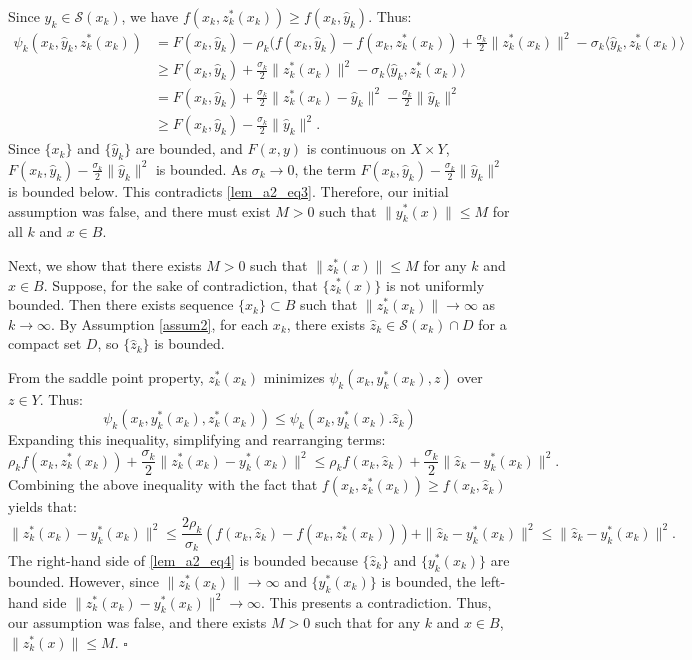 \documentclass{article}
\newenvironment{proof}[1][Proof]{\par
	\normalfont\topsep6pt\relax
	\trivlist\item[\hskip\labelsep\itshape #1.]\ignorespaces
}{%
	\hfill\ensuremath{\square}\endtrivlist
}
\begin{document}
\begin{proof}
\begin{equation}
\end{equation}
Since $\hat{y}_k \in \mathcal{S}(x_k)$, we have $f(x_k,  z_{k}^*(x_{k})) \ge f(x_k, \hat{y}_k)$. Thus:
\[
\begin{aligned}
    \psi_k(x_k, \hat{y}_k, z_{k}^*(x_k)) &= F(x_k, \hat{y}_k) - \rho_k( f(x_k, \hat{y}_k) - f(x_k, z_{k}^*(x_k)) + \frac{\sigma_k}{2}\|z_{k}^*(x_k)\|^2 - \sigma_k \langle \hat{y}_k, z_{k}^*(x_k) \rangle \\
    & \ge F(x_k, \hat{y}_k) + \frac{\sigma_k}{2}\|z_{k}^*(x_k)\|^2 - \sigma_k \langle \hat{y}_k, z_{k}^*(x_k) \rangle \\
    & = F(x_k, \hat{y}_k) + \frac{\sigma_k}{2}\|z_{k}^*(x_k) - \hat{y}_k\|^2 -  \frac{\sigma_k}{2}\|\hat{y}_k\|^2 \\
    & \ge F(x_k, \hat{y}_k) -  \frac{\sigma_k}{2}\|\hat{y}_k\|^2.
\end{aligned}
\]
Since $\{x_k\}$ and $\{\hat{y}_k\}$ are bounded, and $F(x,y)$ is continuous on $X \times Y$, $F(x_k, \hat{y}_k) -  \frac{\sigma_k}{2}\|\hat{y}_k\|^2$ is bounded. As $\sigma_k \rightarrow 0$, the term $ F(x_k, \hat{y}_k) -  \frac{\sigma_k}{2}\|\hat{y}_k\|^2$ is bounded below. This contradicts \eqref{lem_a2_eq3}. Therefore, our initial assumption was false, and there must exist $M > 0$ such that $\|y^*_{k}(x)\| \le M$ for all $k$ and $x \in B$.

Next, we show that there exists $M > 0$ such that $\|z^*_{k}(x)\| \le M$ for any $k$ and $x \in B$. Suppose, for the sake of contradiction, that $\{z^*_{k}(x)\}$ is not uniformly bounded. Then there exists sequence $\{x_k\} \subset B$ such that $\|z^*_{k}(x_k)\| \rightarrow \infty$ as $k \rightarrow \infty$. By Assumption \ref{assum2}, for each $x_k$, there exists $\hat{z}_k \in \mathcal{S}(x_k) \cap D$ for a compact set $D$, so  $\{\hat{z}_k\}$ is bounded.

From the saddle point property, $z_k^*(x_k)$  minimizes $\psi_{k}(x_k, y_k^*(x_k), z)$ over $z \in Y$. Thus:
\[
\psi_{k}(x_k, y_k^*(x_k), z_k^*(x_k)) \le \psi_{k}(x_k, y_k^*(x_k). \hat{z}_k) 
\]
Expanding this inequality, simplifying and rearranging terms:
\[
\rho_k f(x_k, z_{k}^*(x_k)) + \frac{\sigma_k}{2}\|z_{k}^*(x_k) - y_k^*(x_k)\|^2  \le \rho_k f(x_k, \hat{z}_k) + \frac{\sigma_k}{2}\|\hat{z}_k - y_k^*(x_k)\|^2.
\]
Combining the above inequality with the fact that $f(x_k, z_{k}^*(x_k)) \ge f(x_k, \hat{z}_k)$ yields that:
\begin{equation}\label{lem_a2_eq4}
    \|z_{k}^*(x_k) - y_k^*(x_k)\|^2 \le \frac{2\rho_k}{\sigma_k}\left(f(x_k, \hat{z}_k)- f(x_k, z_{k}^*(x_k)) \right) + \|\hat{z}_k - y_k^*(x_k)\|^2 \le \|\hat{z}_k - y_k^*(x_k)\|^2.
\end{equation}
The right-hand side of \eqref{lem_a2_eq4} is bounded because $\{\hat{z}_k\}$ and $\{y_k^*(x_k)\}$ are bounded. However, since $\|z^*_{k}(x_k)\| \rightarrow \infty$ and $\{y_k^*(x_k)\}$ is bounded, the left-hand side 
$\|z_{k}^*(x_k) - y_k^*(x_k)\|^2 \rightarrow \infty$. This presents a contradiction. Thus, our assumption was false, and there exists $M > 0$ such that for any $k$ and $x \in B$, $\|z^*_{k}(x)\| \le M$.
\end{proof}
\end{document}
